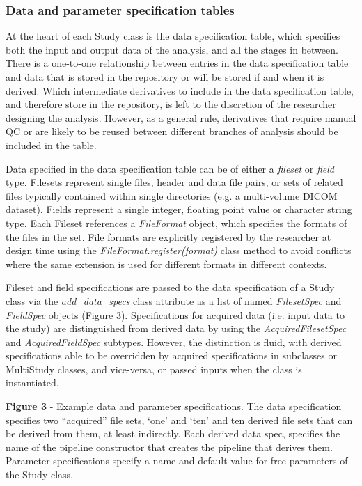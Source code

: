 \subsubsection{Data and parameter specification
tables}
\label{data-and-parameter-specification-tables}

At the heart of each Study class is the data specification table, which
specifies both the input and output data of the analysis, and all the
stages in between. There is a one-to-one relationship between entries in
the data specification table and data that is stored in the repository
or will be stored if and when it is derived. Which intermediate
derivatives to include in the data specification table, and therefore
store in the repository, is left to the discretion of the researcher
designing the analysis. However, as a general rule, derivatives that
require manual QC or are likely to be reused between different branches
of analysis should be included in the table.

Data specified in the data specification table can be of either a
\emph{fileset} or \emph{field} type. Filesets represent single files,
header and data file pairs, or sets of related files typically contained
within single directories (e.g. a multi-volume DICOM dataset). Fields
represent a single integer, floating point value or character string
type. Each Fileset references a \emph{FileFormat} object, which
specifies the formats of the files in the set. File formats are
explicitly registered by the researcher at design time using the
\emph{FileFormat.register(format)} class method to avoid conflicts where
the same extension is used for different formats in different contexts.

Fileset and field specifications are passed to the data specification of
a Study class via the \emph{add\_data\_specs} class attribute as a list
of named \emph{FilesetSpec} and \emph{FieldSpec} objects (Figure 3).
Specifications for acquired data (i.e. input data to the study) are
distinguished from derived data by using the \emph{AcquiredFilesetSpec}
and \emph{AcquiredFieldSpec} subtypes. However, the distinction is
fluid, with derived specifications able to be overridden by acquired
specifications in subclasses or MultiStudy classes, and vice-versa, or
passed inputs when the class is instantiated.


\textbf{Figure 3} - Example data and parameter specifications. The data
specification specifies two ``acquired'' file sets, `one' and `ten' and
ten derived file sets that can be derived from them, at least
indirectly. Each derived data spec, specifies the name of the pipeline
constructor that creates the pipeline that derives them. Parameter
specifications specify a name and default value for free parameters of
the Study class.

